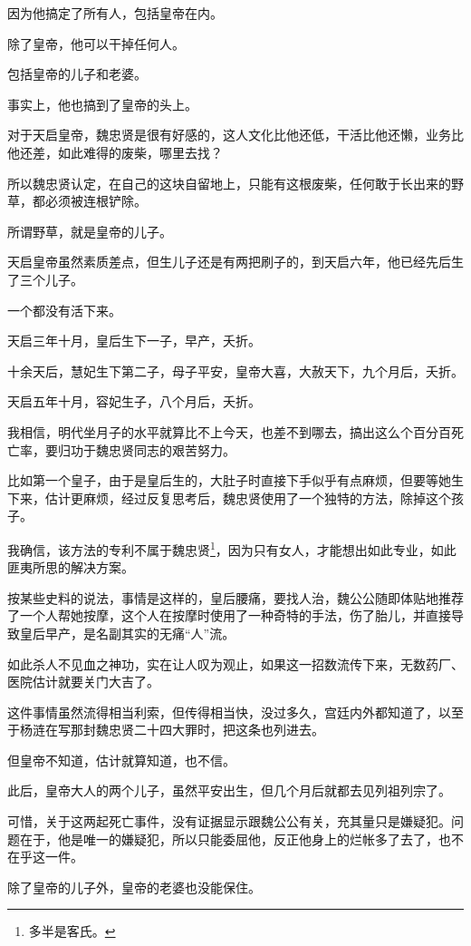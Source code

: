 \begin{multicols}{\theparacolNo}
		因为他搞定了所有人，包括皇帝在内。

		除了皇帝，他可以干掉任何人。

		包括皇帝的儿子和老婆。

		事实上，他也搞到了皇帝的头上。

		对于天启皇帝，魏忠贤是很有好感的，这人文化比他还低，干活比他还懒，业务比他还差，如此难得的废柴，哪里去找？

		所以魏忠贤认定，在自己的这块自留地上，只能有这根废柴，任何敢于长出来的野草，都必须被连根铲除。

		所谓野草，就是皇帝的儿子。

		天启皇帝虽然素质差点，但生儿子还是有两把刷子的，到天启六年，他已经先后生了三个儿子。

		一个都没有活下来。

		天启三年十月，皇后生下一子，早产，夭折。

		十余天后，慧妃生下第二子，母子平安，皇帝大喜，大赦天下，九个月后，夭折。

		天启五年十月，容妃生子，八个月后，夭折。

		我相信，明代坐月子的水平就算比不上今天，也差不到哪去，搞出这么个百分百死亡率，要归功于魏忠贤同志的艰苦努力。

		比如第一个皇子，由于是皇后生的，大肚子时直接下手似乎有点麻烦，但要等她生下来，估计更麻烦，经过反复思考后，魏忠贤使用了一个独特的方法，除掉这个孩子。

		我确信，该方法的专利不属于魏忠贤\footnote{多半是客氏。}，因为只有女人，才能想出如此专业，如此匪夷所思的解决方案。

		按某些史料的说法，事情是这样的，皇后腰痛，要找人治，魏公公随即体贴地推荐了一个人帮她按摩，这个人在按摩时使用了一种奇特的手法，伤了胎儿，并直接导致皇后早产，是名副其实的无痛“人”流。

		如此杀人不见血之神功，实在让人叹为观止，如果这一招数流传下来，无数药厂、医院估计就要关门大吉了。

		这件事情虽然流得相当利索，但传得相当快，没过多久，宫廷内外都知道了，以至于杨涟在写那封魏忠贤二十四大罪时，把这条也列进去。

		但皇帝不知道，估计就算知道，也不信。

		此后，皇帝大人的两个儿子，虽然平安出生，但几个月后就都去见列祖列宗了。

		可惜，关于这两起死亡事件，没有证据显示跟魏公公有关，充其量只是嫌疑犯。问题在于，他是唯一的嫌疑犯，所以只能委屈他，反正他身上的烂帐多了去了，也不在乎这一件。

		除了皇帝的儿子外，皇帝的老婆也没能保住。


\end{multicols}

